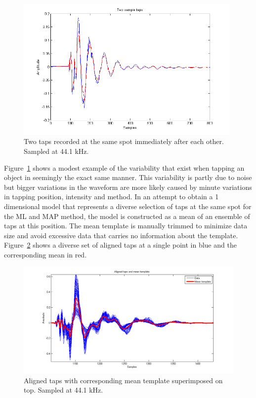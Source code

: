 \begin{figure}[!]
\centering
\includegraphics[width=110mm]{twoSampleTaps.png}
\caption{Two taps recorded at the same spot immediately after each other. Sampled at 44.1 kHz.}\label{fig:twoSampleTaps}
\end{figure}

Figure~\ref{fig:twoSampleTaps} shows a modest example of the variability that exist when tapping an object in seemingly the exact same manner. This variability is partly due to noise but bigger variations in the waveform are more likely caused by minute variations in tapping position, intensity and method. In an attempt to obtain a 1 dimensional model that represents a diverse selection of taps at the same spot for the ML and MAP method, the model is constructed as a mean of an ensemble of taps at this position. The mean template is manually trimmed to minimize data size and avoid excessive data that carries no information about the template. Figure~\ref{fig:alignedAndMean} shows a diverse set of aligned taps at a single point in blue and the corresponding mean in red.

\begin{figure}[!]
\centering
\includegraphics[width=150mm]{alignedAndMean.png}
\caption{Aligned taps with corresponding mean template superimposed on top. Sampled at 44.1 kHz.}\label{fig:alignedAndMean}
\end{figure}

